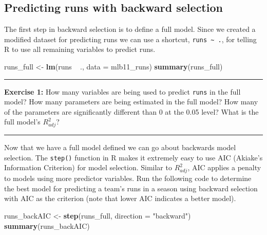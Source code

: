 \documentclass[]{book}
\newenvironment{Shaded}{\begin{snugshade}}{\end{snugshade}}
\newcommand{\KeywordTok}[1]{\textcolor[rgb]{0.13,0.29,0.53}{\textbf{{#1}}}}
\newcommand{\DataTypeTok}[1]{\textcolor[rgb]{0.13,0.29,0.53}{{#1}}}
\newcommand{\StringTok}[1]{\textcolor[rgb]{0.31,0.60,0.02}{{#1}}}
\newcommand{\NormalTok}[1]{{#1}}
\theoremstyle{definition}
\theoremstyle{definition}
\theoremstyle{definition}
\theoremstyle{remark}
\begin{document}
\subsection{Predicting runs with backward
selection}\label{predicting-runs-with-backward-selection}

The first step in backward selection is to define a full model. Since we
created a modified dataset for predicting runs we can use a shortcut,
\texttt{runs\ \textasciitilde{}\ .}, for telling R to use all remaining
variables to predict runs.

\begin{Shaded}
\begin{Highlighting}[]
\NormalTok{runs_full <-}\StringTok{ }\KeywordTok{lm}\NormalTok{(runs ~}\StringTok{ }\NormalTok{., }\DataTypeTok{data =} \NormalTok{mlb11_runs)}
\KeywordTok{summary}\NormalTok{(runs_full)}
\end{Highlighting}
\end{Shaded}

\begin{center}\rule{0.5\linewidth}{\linethickness}\end{center}

\textbf{Exercise 1:} How many variables are being used to predict
\texttt{runs} in the full model? How many parameters are being estimated
in the full model? How many of the parameters are significantly
different than 0 at the 0.05 level? What is the full model's
\(R^2_{adj}\)?

\begin{center}\rule{0.5\linewidth}{\linethickness}\end{center}

Now that we have a full model defined we can go about backwards model
selection. The \texttt{step()} function in R makes it extremely easy to
use AIC (Akiake's Information Criterion) for model selection. Similar to
\(R^2_{adj}\), AIC applies a penalty to models using more predictor
variables. Run the following code to determine the best model for
predicting a team's runs in a season using backward selection with AIC
as the criterion (note that lower AIC indicates a better model).

\begin{Shaded}
\begin{Highlighting}[]
\NormalTok{runs_backAIC <-}\StringTok{ }\KeywordTok{step}\NormalTok{(runs_full, }\DataTypeTok{direction =} \StringTok{"backward"}\NormalTok{)}
\KeywordTok{summary}\NormalTok{(runs_backAIC)}
\end{Highlighting}
\end{Shaded}
\end{document}
